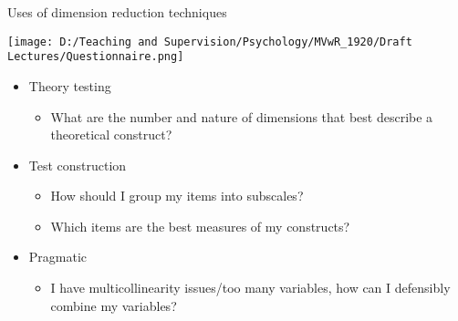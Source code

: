 \documentclass[
  ignorenonframetext,
]{beamer}
\providecommand{\tightlist}{%
  \setlength{\itemsep}{0pt}\setlength{\parskip}{0pt}}
\begin{document}
\begin{frame}{Uses of dimension reduction techniques}
\protect\hypertarget{uses-of-dimension-reduction-techniques}{}

\texttt{[image: D:/Teaching and Supervision/Psychology/MVwR\_1920/Draft Lectures/Questionnaire.png]}

\begin{itemize}
\tightlist
\item
  Theory testing

  \begin{itemize}
  \tightlist
  \item
    What are the number and nature of dimensions that best describe a
    theoretical construct?
  \end{itemize}
\item
  Test construction

  \begin{itemize}
  \tightlist
  \item
    How should I group my items into subscales?
  \item
    Which items are the best measures of my constructs?
  \end{itemize}
\item
  Pragmatic

  \begin{itemize}
  \tightlist
  \item
    I have multicollinearity issues/too many variables, how can I
    defensibly combine my variables?
  \end{itemize}
\end{itemize}

\end{frame}
\end{document}
